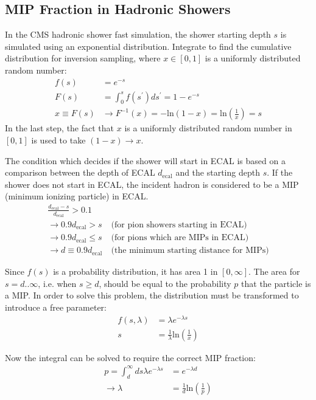 \subsection{MIP Fraction in Hadronic Showers}

In the CMS hadronic shower fast simulation, the shower starting depth $s$ is simulated using an exponential distribution. Integrate to find the cumulative distribution for inversion sampling, where $x \in [0,1]$ is a uniformly distributed random number:
\begin{align}
f(s) &= e^{-s}\\
F(s) &= \int_{0}^{s} f(s^{\prime})ds^{\prime} = 1 - e^{-s}\\
x \equiv F(s) &\rightarrow F^{-1}(x) = -\text{ln}(1-x) = \text{ln}\left(\frac{1}{x}\right) = s
\end{align}
In the last step, the fact that $x$ is a uniformly distributed random number in $[0,1]$ is used to take $(1-x) \rightarrow x$.

The condition which decides if the shower will start in ECAL is based on a comparison between the depth of ECAL $d_{\text{ecal}}$ and the starting depth $s$. If the shower does not start in ECAL, the incident hadron is considered to be a MIP (minimum ionizing particle) in ECAL.
\begin{align}
\frac{d_{\text{ecal}}-s}{d_{\text{ecal}}} > 0.1 &\\
\rightarrow 0.9 d_{\text{ecal}} > s~&\text{(for pion showers starting in ECAL)} \\
\rightarrow 0.9 d_{\text{ecal}} \leq s~&\text{(for pions which are MIPs in ECAL)} \\
\rightarrow d \equiv 0.9 d_{\text{ecal}}~&\text{(the minimum starting distance for MIPs)}
\end{align}

Since $f(s)$ is a probability distribution, it has area 1 in $[0,\infty]$. The area for $s = d..\infty$, i.e. when $s \geq d$, should be equal to the probability $p$ that the particle is a MIP. In order to solve this problem, the distribution must be transformed to introduce a free parameter:
\begin{align}
f(s,\lambda) &= \lambda e^{-\lambda s}\\
s &= \frac{1}{\lambda}\text{ln}\left(\frac{1}{x}\right)
\end{align}

Now the integral can be solved to require the correct MIP fraction:
\begin{align}
p = \int_{d}^{\infty} ds \lambda e^{-\lambda s} &= e^{-\lambda d}\\
\rightarrow \lambda &= \frac{1}{d}\text{ln}\left(\frac{1}{p}\right)
\end{align}

